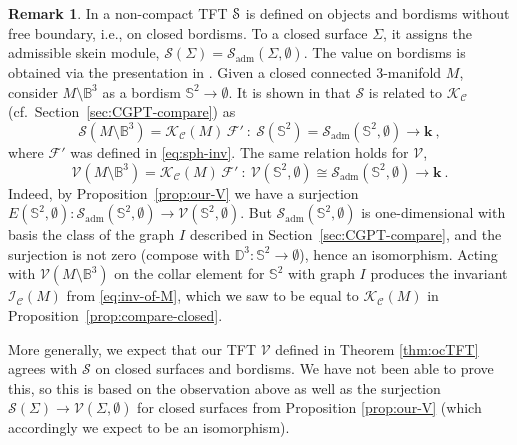 \documentclass[11pt]{amsart}
\theoremstyle{definition}
\newtheorem{remark}[thm]{Remark}
\numberwithin{equation}{section}
\def\adm{\operatorname{adm}}
\def\cgpt{\mathscr{F}}
\def\ourV{\cV}
\def\sk{\cS}
\def\cC{\mathcal{C}}
\def\cS{\mathcal{S}}
\def\cV{\mathcal{V}}
\def\bB{{\mathbb{B}}}
\def\bD{{\mathbb{D}}}
\def\bS{{\mathbb{S}}}
\def\kk{{\bm{k}}}
\def\to{\rightarrow}
\begin{document}
\begin{remark}\label{rmk:compare}
In \cite{CGPV23} a non-compact TFT $\EuScript{S}$ is defined on objects and bordisms without free boundary, i.e., on closed bordisms. To a closed surface $\Sigma$, it assigns the admissible skein module, $\mathscr{S}(\Sigma) = \sk_{\adm}(\Sigma,\emptyset)$. The value on bordisms is obtained via the presentation in \cite{Juh18}. Given a closed connected 3-manifold $M$, consider $M \setminus \bB^3$ as a bordism $\bS^2 \to \emptyset$. 
It is shown in \cite[Thm.\,3.5]{CGPV23} that $\mathscr{S}$ is related to $\mathcal{K}_\cC$ (cf.\ Section~\ref{sec:CGPT-compare}) as
\begin{equation}
    \mathscr{S}(M \setminus \bB^3) = \mathcal{K}_\cC(M) \, \cgpt' ~:~ \mathscr{S}(\bS^2) = \sk_{\adm}(\bS^2,\emptyset) \to \kk \ ,
\end{equation}
where $\cgpt'$ was defined in \eqref{eq:sph-inv}. The same relation holds for $\ourV$,
\begin{equation}
    \ourV(M \setminus \bB^3) = \mathcal{K}_\cC(M) \, \cgpt' ~:~ \ourV(\bS^2,\emptyset) \cong \sk_{\adm}(\bS^2,\emptyset) \to \kk \ .
\end{equation}
Indeed, by Proposition~\ref{prop:our-V} we have a surjection $E(\bS^2,\emptyset) : \sk_{\adm}(\bS^2,\emptyset) \to \ourV(\bS^2,\emptyset)$. But $\sk_{\adm}(\bS^2,\emptyset)$ is one-dimensional with basis the class of the graph $I$ described in Section~\ref{sec:CGPT-compare}, and the surjection is not zero (compose with $\bD^3 : \bS^2 \to \emptyset$), hence an isomorphism. Acting with $\ourV(M \setminus \bB^3)$ on the collar element for $\bS^2$ with graph $I$ produces the invariant $\mathscr{I}_{\cC}(M)$ from \eqref{eq:inv-of-M}, which we saw to be equal to $\mathcal{K}_\cC(M)$ in Proposition~\ref{prop:compare-closed}.

More generally, we expect that our TFT $\ourV$ defined in Theorem \ref{thm:ocTFT} agrees with $\mathscr{S}$ on closed surfaces and bordisms. We have not been able to prove this, so this is based on the observation above as well as the surjection $\mathscr{S}(\Sigma) \to \ourV(\Sigma,\emptyset)$ for closed surfaces from Proposition \ref{prop:our-V} (which accordingly we expect to be an isomorphism). 
\end{remark}
\end{document}
